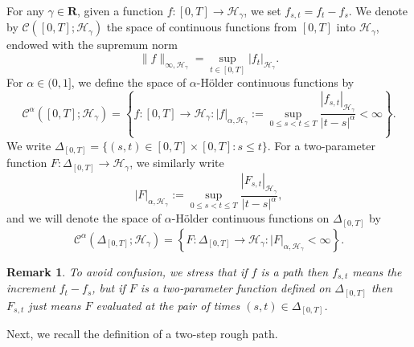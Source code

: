 \documentclass[10pt,a4paper]{article}
\newtheorem{remark}{Remark}[section]
\numberwithin{equation}{section}
\begin{document}
For any $\gamma \in \mathbf{R}$, given a function $f:[0,T] \to \mathcal{H}_\gamma$, we set $f_{s,t}=f_t-f_s$.
We denote by $\mathcal C([0,T]; \mathcal H_\gamma)$ the space of continuous functions from $[0,T]$ into $\mathcal{H}_\gamma$, endowed with the supremum norm $$\|f\|_{\infty,\mathcal H_\gamma}= \sup_{t\in [0,T]} |f_t|_{\mathcal H_\gamma}.$$
For $\alpha \in (0, 1]$, we define the space of $\alpha$-H\"{o}lder continuous functions by
\begin{equation}\label{onepath}
\mathcal{C}^\alpha ([0,T]; \mathcal H_\gamma) =\left\{f:[0,T] \to \mathcal{H}_\gamma : |f|_{\alpha,\mathcal H_\gamma} := \sup_{0\leq s<t\leq T} \frac{|f_{s,t}|_{\mathcal H_\gamma}}{|t-s|^{\alpha}}<\infty \right\}.
\end{equation}
We write $\Delta_{[0,T]} = \{(s, t) \in [0,T] \times [0,T]: s \leq t\}$.
For a two-parameter function $F:\Delta_{[0,T]} \to \mathcal H_\gamma$, we similarly write
\begin{equation}\label{twopara}
|F|_{\alpha,\mathcal H_\gamma}:=\sup_{0\leq s<t\leq T} \frac {|F_{s,t}|_{\mathcal H_\gamma}} {|t-s|^\alpha},
\end{equation}
and we will denote the space of $\alpha$-H\"{o}lder continuous functions on $\Delta_{[0,T]}$ by
$$\mathcal{C}^\alpha(\Delta_{[0,T]}; \mathcal H_\gamma)=\left\{ F:\Delta_{[0,T]} \to \mathcal H_\gamma : |F|_{\alpha,\mathcal H_\gamma} <\infty \right\}.$$






\begin{remark}
To avoid confusion, we stress that if $f$ is a path then $f_{s,t}$ means the increment $f_t-f_s$, but if $F$ is a two-parameter function defined on $\Delta_{[0,T]}$ then $F_{s,t}$ just means $F$ evaluated at the pair of times $(s,t) \in \Delta_{[0,T]}$.
\end{remark}



Next,  we recall the definition of a two-step rough path.
\end{document}
